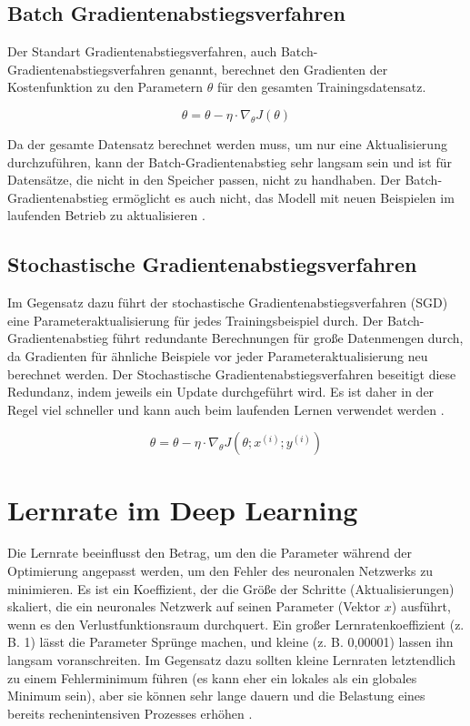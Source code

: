     \subsection{Batch Gradientenabstiegsverfahren}
    Der Standart Gradientenabstiegsverfahren, auch Batch-Gradientenabstiegsverfahren genannt, berechnet den Gradienten der Kostenfunktion zu den Parametern $\theta$ für den gesamten Trainingsdatensatz.


    \begin{equation} \label{FormelGradBatch}
      \theta = \theta - \eta \cdot \nabla_{\theta}J(\theta)
    \end{equation}

    Da der gesamte Datensatz berechnet werden muss, um nur eine Aktualisierung durchzuführen, kann der Batch-Gradientenabstieg sehr langsam sein und ist für Datensätze, die nicht in den Speicher passen, nicht zu handhaben. Der Batch-Gradientenabstieg ermöglicht es auch nicht, das Modell mit neuen Beispielen im laufenden Betrieb zu aktualisieren \cite*{Ruder2016}.

    \subsection{Stochastische Gradientenabstiegsverfahren}

    Im Gegensatz dazu führt der stochastische Gradientenabstiegsverfahren (SGD) eine Parameteraktualisierung für jedes Trainingsbeispiel durch. Der Batch-Gradientenabstieg führt redundante Berechnungen für große Datenmengen durch, da Gradienten für ähnliche Beispiele vor jeder Parameteraktualisierung neu berechnet werden. Der Stochastische Gradientenabstiegsverfahren beseitigt diese Redundanz, indem jeweils ein Update durchgeführt wird. Es ist daher in der Regel viel schneller und kann auch beim laufenden Lernen verwendet werden \cite*{Ruder2016}.

    \begin{equation} \label{FormelGradStoch}
      \theta = \theta - \eta \cdot \nabla_{\theta}J(\theta;x^{(i)};y^{(i)})
    \end{equation}



    \section{Lernrate im Deep Learning}
    Die Lernrate beeinflusst den Betrag, um den die Parameter während der Optimierung angepasst werden, um den Fehler des neuronalen Netzwerks zu minimieren. Es ist ein Koeffizient, der die Größe der Schritte (Aktualisierungen) skaliert, die ein neuronales Netzwerk auf seinen Parameter (Vektor $x$) ausführt, wenn es den Verlustfunktionsraum durchquert. Ein großer Lernratenkoeffizient (z. B. 1) lässt die Parameter Sprünge machen, und kleine (z. B. 0,00001) lassen ihn langsam voranschreiten. Im Gegensatz dazu sollten kleine Lernraten letztendlich zu einem Fehlerminimum führen (es kann eher ein lokales als ein globales Minimum sein), aber sie können sehr lange dauern und die Belastung eines bereits rechenintensiven Prozesses erhöhen  \cite*[77]{Patterson2019}.


